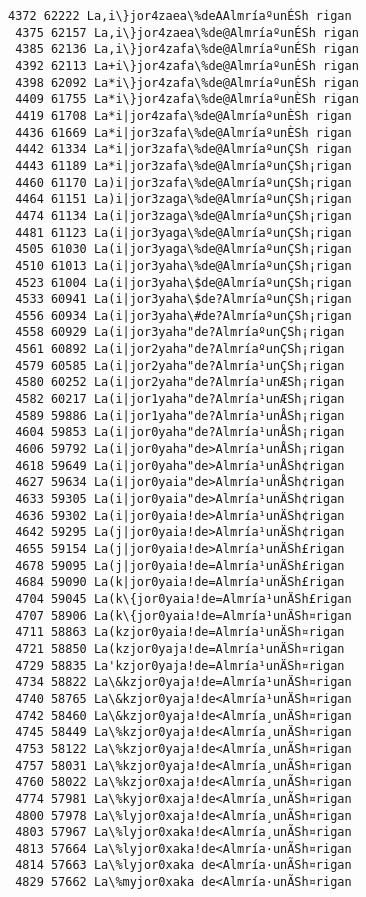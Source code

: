 \documentclass[11pt]{article}
\begin{document}
\begin{Verbatim}[commandchars=\\\{\}]
 4372 62222 La,i\}jor4zaea\%deAAlmríaºunÉSh rigan
 4375 62157 La,i\}jor4zaea\%de@AlmríaºunÉSh rigan
 4385 62136 La,i\}jor4zafa\%de@AlmríaºunÉSh rigan
 4392 62113 La+i\}jor4zafa\%de@AlmríaºunÉSh rigan
 4398 62092 La*i\}jor4zafa\%de@AlmríaºunÉSh rigan
 4409 61755 La*i\}jor4zafa\%de@AlmríaºunÈSh rigan
 4419 61708 La*i|jor4zafa\%de@AlmríaºunÈSh rigan
 4436 61669 La*i|jor3zafa\%de@AlmríaºunÈSh rigan
 4442 61334 La*i|jor3zafa\%de@AlmríaºunÇSh rigan
 4443 61189 La*i|jor3zafa\%de@AlmríaºunÇSh¡rigan
 4460 61170 La)i|jor3zafa\%de@AlmríaºunÇSh¡rigan
 4464 61151 La)i|jor3zaga\%de@AlmríaºunÇSh¡rigan
 4474 61134 La(i|jor3zaga\%de@AlmríaºunÇSh¡rigan
 4481 61123 La(i|jor3yaga\%de@AlmríaºunÇSh¡rigan
 4505 61030 La(i|jor3yaga\%de@AlmríaºunÇSh¡rigan
 4510 61013 La(i|jor3yaha\%de@AlmríaºunÇSh¡rigan
 4523 61004 La(i|jor3yaha\$de@AlmríaºunÇSh¡rigan
 4533 60941 La(i|jor3yaha\$de?AlmríaºunÇSh¡rigan
 4556 60934 La(i|jor3yaha\#de?AlmríaºunÇSh¡rigan
 4558 60929 La(i|jor3yaha"de?AlmríaºunÇSh¡rigan
 4561 60892 La(i|jor2yaha"de?AlmríaºunÇSh¡rigan
 4579 60585 La(i|jor2yaha"de?Almría¹unÇSh¡rigan
 4580 60252 La(i|jor2yaha"de?Almría¹unÆSh¡rigan
 4582 60217 La(i|jor1yaha"de?Almría¹unÆSh¡rigan
 4589 59886 La(i|jor1yaha"de?Almría¹unÅSh¡rigan
 4604 59853 La(i|jor0yaha"de?Almría¹unÅSh¡rigan
 4606 59792 La(i|jor0yaha"de>Almría¹unÅSh¡rigan
 4618 59649 La(i|jor0yaha"de>Almría¹unÅSh¢rigan
 4627 59634 La(i|jor0yaia"de>Almría¹unÅSh¢rigan
 4633 59305 La(i|jor0yaia"de>Almría¹unÄSh¢rigan
 4636 59302 La(i|jor0yaia!de>Almría¹unÄSh¢rigan
 4642 59295 La(j|jor0yaia!de>Almría¹unÄSh¢rigan
 4655 59154 La(j|jor0yaia!de>Almría¹unÄSh£rigan
 4678 59095 La(j|jor0yaia!de=Almría¹unÄSh£rigan
 4684 59090 La(k|jor0yaia!de=Almría¹unÄSh£rigan
 4704 59045 La(k\{jor0yaia!de=Almría¹unÄSh£rigan
 4707 58906 La(k\{jor0yaia!de=Almría¹unÄSh¤rigan
 4711 58863 La(kzjor0yaia!de=Almría¹unÄSh¤rigan
 4721 58850 La(kzjor0yaja!de=Almría¹unÄSh¤rigan
 4729 58835 La'kzjor0yaja!de=Almría¹unÄSh¤rigan
 4734 58822 La\&kzjor0yaja!de=Almría¹unÄSh¤rigan
 4740 58765 La\&kzjor0yaja!de<Almría¹unÄSh¤rigan
 4742 58460 La\&kzjor0yaja!de<Almría¸unÄSh¤rigan
 4745 58449 La\%kzjor0yaja!de<Almría¸unÄSh¤rigan
 4753 58122 La\%kzjor0yaja!de<Almría¸unÃSh¤rigan
 4757 58031 La\%kzjor0yaja!de<Almría¸unÃSh¤rigan
 4760 58022 La\%kzjor0xaja!de<Almría¸unÃSh¤rigan
 4774 57981 La\%kyjor0xaja!de<Almría¸unÃSh¤rigan
 4800 57978 La\%lyjor0xaja!de<Almría¸unÃSh¤rigan
 4803 57967 La\%lyjor0xaka!de<Almría¸unÃSh¤rigan
 4813 57664 La\%lyjor0xaka!de<Almría·unÃSh¤rigan
 4814 57663 La\%lyjor0xaka de<Almría·unÃSh¤rigan
 4829 57662 La\%myjor0xaka de<Almría·unÃSh¤rigan

\end{Verbatim}
\end{document}
